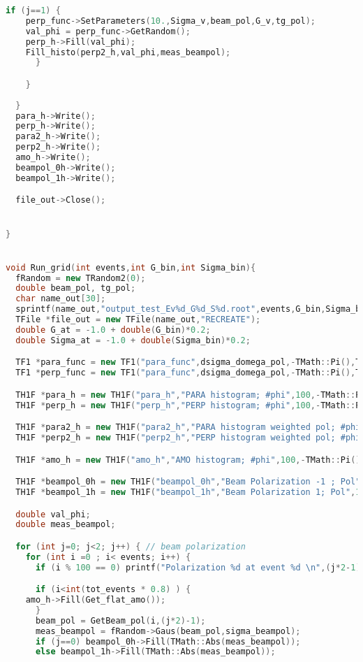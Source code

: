 \begin{lstlisting}[language=C++]
      if (j==1) {
	perp_func->SetParameters(10.,Sigma_v,beam_pol,G_v,tg_pol);
	val_phi = perp_func->GetRandom();
	perp_h->Fill(val_phi);
	Fill_histo(perp2_h,val_phi,meas_beampol);
      }

    }
    
  }
  para_h->Write();
  perp_h->Write();
  para2_h->Write();
  perp2_h->Write();
  amo_h->Write();
  beampol_0h->Write();
  beampol_1h->Write();

  file_out->Close();


}


void Run_grid(int events,int G_bin,int Sigma_bin){
  fRandom = new TRandom2(0);
  double beam_pol, tg_pol;
  char name_out[30];
  sprintf(name_out,"output_test_Ev%d_G%d_S%d.root",events,G_bin,Sigma_bin);
  TFile *file_out = new TFile(name_out,"RECREATE");
  double G_at = -1.0 + double(G_bin)*0.2;
  double Sigma_at = -1.0 + double(Sigma_bin)*0.2;

  TF1 *para_func = new TF1("para_func",dsigma_domega_pol,-TMath::Pi(),TMath::Pi(),5);
  TF1 *perp_func = new TF1("para_func",dsigma_domega_pol,-TMath::Pi(),TMath::Pi(),5);

  TH1F *para_h = new TH1F("para_h","PARA histogram; #phi",100,-TMath::Pi(),TMath::Pi());
  TH1F *perp_h = new TH1F("perp_h","PERP histogram; #phi",100,-TMath::Pi(),TMath::Pi());

  TH1F *para2_h = new TH1F("para2_h","PARA histogram weighted pol; #phi",100,-TMath::Pi(),TMath::Pi());
  TH1F *perp2_h = new TH1F("perp2_h","PERP histogram weighted pol; #phi",100,-TMath::Pi(),TMath::Pi());

  TH1F *amo_h = new TH1F("amo_h","AMO histogram; #phi",100,-TMath::Pi(),TMath::Pi());

  TH1F *beampol_0h = new TH1F("beampol_0h","Beam Polarization -1 ; Pol",100,0.,1.0);
  TH1F *beampol_1h = new TH1F("beampol_1h","Beam Polarization 1; Pol",100,0.,1.0);

  double val_phi;
  double meas_beampol;

  for (int j=0; j<2; j++) { // beam polarization
    for (int i =0 ; i< events; i++) {
      if (i % 100 == 0) printf("Polarization %d at event %d \n",(j*2-1),i);

      if (i<int(tot_events * 0.8) ) {
	amo_h->Fill(Get_flat_amo());
      }
      beam_pol = GetBeam_pol(i,(j*2)-1);
      meas_beampol = fRandom->Gaus(beam_pol,sigma_beampol);
      if (j==0) beampol_0h->Fill(TMath::Abs(meas_beampol));
      else beampol_1h->Fill(TMath::Abs(meas_beampol));
   

\end{lstlisting}
